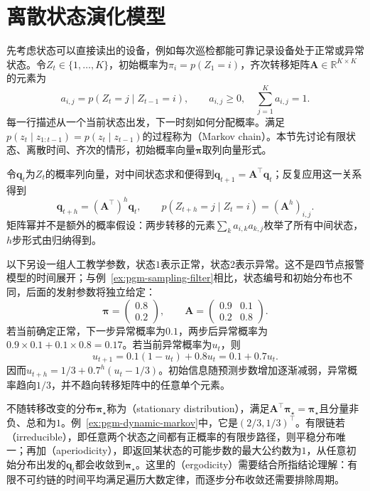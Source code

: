 \section{离散状态演化模型}
\label{sec:pgm-dynamic-discrete}

先考虑状态可以直接读出的设备，例如每次巡检都能可靠记录设备处于正常或异常状态。令$Z_t\in\{1,\ldots,K\}$，初始概率为$\pi_i=p(Z_1=i)$，齐次转移矩阵$\bm{A}\in\mathbb{R}^{K\times K}$的元素为
\[
  a_{i,j}=p(Z_t=j\mid Z_{t-1}=i),\qquad
  a_{i,j}\geq0,\quad \sum_{j=1}^{K}a_{i,j}=1.
\]
每一行描述从一个当前状态出发，下一时刻如何分配概率。满足$p(z_t\mid z_{1:t-1})=p(z_t\mid z_{t-1})$的过程称为（Markov chain）。本节先讨论有限状态、离散时间、齐次的情形，初始概率向量$\bm{\pi}$取列向量形式。

令$\bm{q}_t$为$Z_t$的概率列向量，对中间状态求和便得到$\bm{q}_{t+1}=\bm{A}^{\top}\bm{q}_t$；反复应用这一关系得到
\begin{equation}
  \bm{q}_{t+h}=(\bm{A}^{\top})^h\bm{q}_t,\qquad
  p(Z_{t+h}=j\mid Z_t=i)=(\bm{A}^h)_{i,j}.
  \label{eq:pgm-dynamic-markov-prediction}
\end{equation}
矩阵幂并不是额外的概率假设：两步转移的元素$\sum_k a_{i,k}a_{k,j}$枚举了所有中间状态，$h$步形式由归纳得到。

\begin{example}[两状态设备的多步预测]
  \label{ex:pgm-dynamic-markov}
  以下另设一组人工教学参数，状态$1$表示正常，状态$2$表示异常。这不是四节点报警模型的时间展开；与例~\ref{ex:pgm-sampling-filter}相比，状态编号和初始分布也不同，后面的发射参数将独立给定：
  \[
    \bm{\pi}=\begin{pmatrix}0.8\\0.2\end{pmatrix},\qquad
    \bm{A}=
    \begin{pmatrix}0.9&0.1\\0.2&0.8\end{pmatrix}.
  \]
  若当前确定正常，下一步异常概率为$0.1$，两步后异常概率为$0.9\times0.1+0.1\times0.8=0.17$。若当前异常概率为$u_t$，则
  \[
    u_{t+1}=0.1(1-u_t)+0.8u_t=0.1+0.7u_t.
  \]
  因而$u_{t+h}=1/3+0.7^h(u_t-1/3)$。初始信息随预测步数增加逐渐减弱，异常概率趋向$1/3$，并不趋向转移矩阵中的任意单个元素。
\end{example}

不随转移改变的分布$\bm{\pi}_{\star}$称为（stationary distribution），满足$\bm{A}^{\top}\bm{\pi}_{\star}=\bm{\pi}_{\star}$且分量非负、总和为$1$。例~\ref{ex:pgm-dynamic-markov}中，它是$(2/3,1/3)^\top$。有限链若（irreducible），即任意两个状态之间都有正概率的有限步路径，则平稳分布唯一；再加（aperiodicity），即返回某状态的可能步数的最大公约数为$1$，从任意初始分布出发的$\bm{q}_t$都会收敛到$\bm{\pi}_{\star}$。这里的（ergodicity）需要结合所指结论理解：有限不可约链的时间平均满足遍历大数定律，而逐步分布收敛还需要排除周期。


